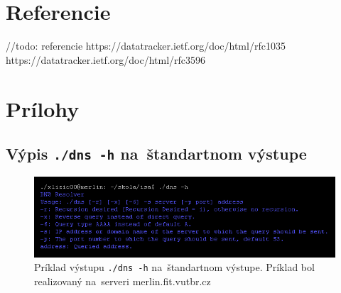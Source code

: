 \documentclass[a4paper, 11pt]{article}
\begin{document}
	\section{Referencie}
	//todo: referencie
	https://datatracker.ietf.org/doc/html/rfc1035
	https://datatracker.ietf.org/doc/html/rfc3596

	\clearpage
	\section{Prílohy}
	
	\subsection{Výpis \texttt{./dns -h} na~štandartnom výstupe}
	\label{subsection:res_A}

	\begin{figure}[ht]
		\centering
		\includegraphics[width=1 \linewidth]{res/A.png}

		\caption{Príklad výstupu \texttt{./dns -h} na~štandartnom výstupe. Príklad bol realizovaný na~serveri \mbox{merlin.fit.vutbr.cz}}
	\end{figure}
\end{document}
